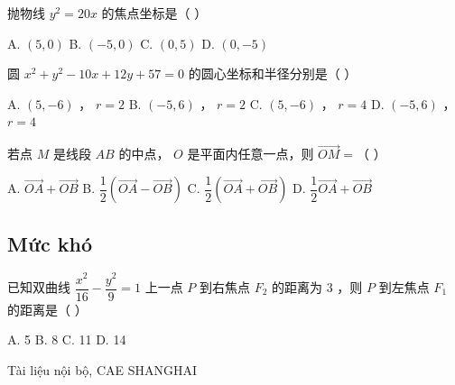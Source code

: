 \documentclass[11pt, a4paper]{article}
\begin{document}
\begin{baitap}[7]
抛物线 $y^2 = 20x$ 的焦点坐标是（ ）
\par\vspace{3pt}
\noindent A. $(5,0)$ \quad B. $(-5,0)$ \quad C. $(0,5)$ \quad D. $(0, -5)$
\end{baitap}
\begin{baitap}[8]
圆 $x^2 + y^2 - 10x + 12y + 57 = 0$ 的圆心坐标和半径分别是（ ）
\par\vspace{3pt}
\noindent A. $(5,-6)$ ， $r = 2$ \quad B. $(-5,6)$ ， $r = 2$ \quad C. $(5,-6)$ ， $r = 4$ \quad D. $(-5,6)$ ， $r = 4$
\end{baitap}
\begin{baitap}[9]
若点 $M$ 是线段 $AB$ 的中点， $O$ 是平面内任意一点，则 $\vec{OM} =$（ ）
\par\vspace{3pt}
\noindent A. $\vec{OA} + \vec{OB}$ \quad B. $\dfrac{1}{2}(\vec{OA} - \vec{OB})$ \quad C. $\dfrac{1}{2}(\vec{OA} + \vec{OB})$ \quad D. $\dfrac{1}{2}\vec{OA} + \vec{OB}$
\end{baitap}
\subsection{Mức khó}

\begin{baitap}[10]
已知双曲线 $\dfrac{x^2}{16} - \dfrac{y^2}{9} = 1$ 上一点 $P$ 到右焦点 $F_2$ 的距离为 $3$ ，则 $P$ 到左焦点 $F_1$ 的距离是（ ）
\par\vspace{3pt}
\noindent A. 5 \quad B. 8 \quad C. 11 \quad D. 14
\end{baitap}
\vspace{0.8cm}
\begin{center}
{\footnotesize\color{cae_blue} Tài liệu nội bộ, CAE SHANGHAI}
\end{center}
\end{document}
